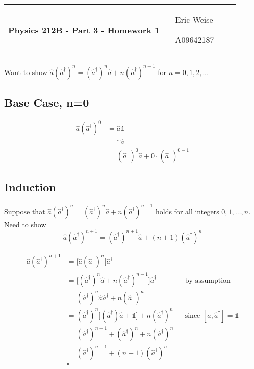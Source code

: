 \documentclass{article}
\newcommand{\assignment}[1]{
    \newpage
    \begin{tabular}{p{0.65\linewidth}p{0.25\linewidth}}
        {\bf\LARGE Physics 212B - Part 3 - Homework #1 }
        &
        \parbox[b]{0.24\textwidth}{
            \hfill Eric Weise

            \hfill A09642187
            }
    \end{tabular}
    \vspace{12pt}
    \newline
}
\renewcommand{\RAISE}[0]{\hat{a}^{\dagger}}
\renewcommand{\LOWER}[0]{\hat{a}}
\begin{document}
\assignment{1}
Want to show 
\( \LOWER(\RAISE)^n = (\RAISE)^n\LOWER + n(\RAISE)^{n-1} \)
for $n=0,1,2,...$

\subsection*{Base Case, n=0}
\begin{align*}
    \LOWER(\RAISE)^0
    &= \LOWER \mathbb{1} \\
    &= \mathbb{1} \LOWER \\
    &= (\RAISE)^0 \LOWER + 0 \cdot (\RAISE)^{0-1}
\end{align*}

\subsection*{Induction}
Suppose that
\( \LOWER(\RAISE)^n = (\RAISE)^n\LOWER + n(\RAISE)^{n-1} \)
holds for all integers $0,1,\ldots,n$.
Need to show
\[ \LOWER(\RAISE)^{n+1} = (\RAISE)^{n+1}\LOWER + (n+1)(\RAISE)^n \]

\begin{align*}
    \LOWER(\RAISE)^{n+1}
    &= \big[ \LOWER(\RAISE)^n \big] \RAISE \\
    &= \big[ (\RAISE)^n\LOWER + n(\RAISE)^{n-1} \big] \RAISE
        && \text{by assumption}\\
    &= (\RAISE)^n \LOWER \RAISE + n (\RAISE)^n \\
    &= (\RAISE)^n \big[ (\RAISE)\LOWER + \mathbb{1} \big] + n(\RAISE)^n
        && \text{since }[\LOWER,\RAISE] = \mathbb{1} \\
    &= (\RAISE)^{n+1} + (\RAISE)^n + n(\RAISE)^n \\
    &= (\RAISE)^{n+1} + (n+1)(\RAISE)^n \\
    & \square
\end{align*}
\end{document}
